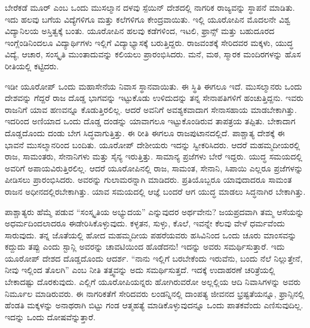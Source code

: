 \vskip 5pt

ಬೇರೆಕಡೆ ಮೂರ್​ ಎಂಬ ಒಂದು ಮುಸಲ್ಮಾನ ದಳವು ಸ್ಪೆಯಿನ್​ ದೇಶದಲ್ಲಿ ನಾಗರಿಕ ರಾಜ್ಯವನ್ನು ಸ್ಥಾಪನೆ ಮಾಡಿತು. ಇದು ಹಲವು ಬಗೆಯ ವಿದ್ಯೆಗಳಿಗೂ ಮತ್ತು ಕಲೆಗಳಿಗೂ ಕೇಂದ್ರವಾಯಿತು. ಇಲ್ಲಿ ಯೂರೋಪಿನ ಮೊದಲನೇ ವಿಶ್ವ ವಿದ್ಯಾನಿಲಯ ಅಸ್ತಿತ್ವಕ್ಕೆ ಬಂತು. ಯೂರೋಪಿನ ಹಲವು ಕಡೆಗಳಿಂದ, ಇಟಲಿ, ಫ್ರಾನ್ಸ್​ ಮತ್ತು ಬಹುದೂರದ ಇಂಗ್ಲೆಂಡಿನಿಂದಲೂ ವಿದ್ಯಾರ್ಥಿಗಳು ಇಲ್ಲಿಗೆ ವಿದ್ಯಾಭ್ಯಾಸಕ್ಕೆ ಬರುತ್ತಿದ್ದರು. ರಾಜವಂಶಕ್ಕೆ ಸೇರಿದವರ ಮಕ್ಕಳು, ಯುದ್ಧ ವಿದ್ಯೆ, ಆಚಾರ, ಸಂಸ್ಕೃತಿ ಮುಂತಾದುವನ್ನು ಕಲಿಯಲು ಪ್ರಾರಂಭಿಸಿದರು. ಮನೆ, ಮಠ, ಸ್ಮಾರಕ ಮಂದಿರಗಳನ್ನು ಹೊಸ ರೀತಿಯಲ್ಲಿ ಕಟ್ಟಿದರು.

\vskip 5pt

ಇಡೀ ಯೂರೋಪ್​ ಒಂದು ಮಹಾಸೇನೆಯ ನಿವಾಸ ಸ್ಥಾನವಾಯಿತು. ಈ ಸ್ಥಿತಿ ಈಗಲೂ ಇದೆ. ಮುಸಲ್ಮಾನರು ಒಂದು ದೇಶವನ್ನು ಗೆದ್ದರೆ ರಾಜ ದೊಡ್ಡ ಭಾಗವನ್ನು ಇಟ್ಟುಕೊಡು ಉಳಿದುದನ್ನು ತನ್ನ ಸೇನಾಪತಿಗಳಿಗೆ ಹಂಚುತ್ತಿದ್ದನು. ಇವರು ರಾಜನಿಗೆ ಯಾವ ಹಣವನ್ನೂ ಕೊಡುತ್ತಿರಲಿಲ್ಲ. ಆದರೆ ಅವನಿಗೆ ಅವಶ್ಯಕವಾದಾಗ ಸೇನಾಸಹಾಯ ಮಾಡಬೇಕಾಗಿತ್ತು. ಇದರಿಂದ ಅಣಿಯಾದ ಒಂದು ದೊಡ್ಡ ದಂಡನ್ನು ಯಾವಾಗಲೂ ಇಟ್ಟುಕೊಂಡಿರುವ ತಾಪತ್ರಯ ತಪ್ಪಿತು. ಬೇಕಾದಾಗ ದೊಡ್ಡದೊಂದು ದಂಡು ಬೇಗ ಸಿದ್ಧವಾಗುತ್ತಿತ್ತು. ಈ ರೀತಿ ಈಗಲೂ ರಾಜಪುಟಾನದಲ್ಲಿದೆ. ಪಾಶ್ಚಾತ್ಯ ದೇಶಕ್ಕೆ ಈ ಭಾವನೆ ಮುಸಲ್ಮಾನರಿಂದ ಬಂದಿತು. ಯೂರೋಪ್​ ದೇಶೀಯರು ಇದನ್ನು ಸ್ವೀಕರಿಸಿದರು. ಆದರೆ ಮಹಮ್ಮದೀಯರಲ್ಲಿ ರಾಜ, ಸಾಮಂತರು, ಸೇನಾನಿಗಳು ಮತ್ತು ಸೈನ್ಯ ಇರುತ್ತಿತ್ತು. ಸಾಮಾನ್ಯ ಪ್ರಜೆಗಳು ಬೇರೆ ಇದ್ದರು. ಯುದ್ಧ ಸಮಯದಲ್ಲಿ ಅವರಿಗೆ ಅಪಾಯವಿರುತ್ತಿರಲಿಲ್ಲ. ಆದರೆ ಯೂರೋಪಿನಲ್ಲಿ ರಾಜ, ಸಾಮಂತ, ಸೇನಾನಿ, ಸಿಪಾಯಿ ಎಲ್ಲರೂ ಪ್ರಜೆಗಳನ್ನು ಪೀಡಿಸಲು ಪ್ರಾರಂಭಿಸಿದರು. ಅವರನ್ನು ಗುಲಾಮರನ್ನಾಗಿ ಮಾಡಿದರು. ಪ್ರತಿಯೊಬ್ಬರೂ ಯಾವುದಾದರೂ ಸಾಮಂತ ರಾಜನ ಅಧೀನದಲ್ಲಿರಬೇಕಾಗಿತ್ತು. ಯಾವ ಸಮಯದಲ್ಲಿ ಆಜ್ಞೆ ಬಂದರೆ ಆಗ ಯುದ್ಧ ಮಾಡಲು ಸಿದ್ಧನಾಗಿರ ಬೇಕಾಗಿತ್ತು.

ಪಾಶ್ಚಾತ್ಯರು ಹೆಮ್ಮೆ ಪಡುವ “ಸಂಸ್ಕೃತಿಯ ಅಭ್ಯುದಯ” ಎನ್ನುವುದರ ಅರ್ಥವೇನು? ಜಯಪ್ರದವಾಗಿ ತಮ್ಮ ಆಸೆಯನ್ನು ಅಧರ್ಮದಿಂದಲಾದರೂ ಈಡೇರಿಸಿಕೊಳ್ಳುವುದು. ಕಳ್ಳತನ, ಸುಳ್ಳು, ಕೊಲೆ, ಇವನ್ನೇ ಕೆಲವು ವೇಳೆ ಧರ್ಮವೆಂದು ಸಾರುವುದು. ತನ್ನ ಜೊತೆಯಲ್ಲಿ ಹೋದ ಮಹಮ್ಮದೀಯ ಪಹರೆಯವರು ಹಸಿವಿನಿಂದ ಒಂದು ಚೂರು ಮಾಂಸವನ್ನು ಕದ್ದುದು ತಪ್ಪು ಎಂದು ಸ್ಟಾನ್ಲಿ ಅವರನ್ನು ಚಾವಟಿಯಿಂದ ಹೊಡೆದನು! ಇದನ್ನು ಅವರು ಸಮರ್ಥಿಸುತ್ತಾರೆ. ಇದು ಯೂರೋಪ್​ ದೇಶದ ದೊಡ್ಡದೊಂದು ಆದರ್ಶ. “ನಾನು ಇಲ್ಲಿಗೆ ಬರಬೇಕೆಂದು ಇರುವೆನು, ಬಂದು ನೆಲೆ ನಿಲ್ಲುತ್ತೇನೆ, ನೀವು ಇಲ್ಲಿಂದ ತೊಲಗಿ” ಎಂಬ ನೀತಿ ತತ್ತ್ವವನ್ನು ಅದು ಸಮರ್ಥಿಸುತ್ತದೆ. ಇದಕ್ಕೆ ಉದಾಹರಣೆ ಚರಿತ್ರೆಯಲ್ಲಿ ಬೇಕಾದಷ್ಟು ದೊರಕುವುದು. ಎಲ್ಲಿಗೆ ಯೂರೋಪಿಯನ್ನರು ಹೋಗಿರುವರೋ ಅಲ್ಲಲ್ಲಿಯ ಆದಿ ನಿವಾಸಿಗಳನ್ನು ಅವರು ನಿರ್ಮೂಲ ಮಾಡಿರುವರು. ಈ ನಾಗರಿಕತೆಗೆ ಸೇರಿದವರು ಲಂಡನ್ನಿನಲ್ಲಿ ದಾಂಪತ್ಯ ಜೀವನದ ಭ್ರಷ್ಟತೆಯನ್ನೂ, ಫ್ರಾನ್ಸಿನಲ್ಲಿ ಹೆಂಡತಿ ಮಕ್ಕಳನ್ನು ಅನಾಥರಾಗಿ ಬಿಟ್ಟು ಗಂಡ ಆತ್ಮಹತ್ಯೆ ಮಾಡಿಕೊಳ್ಳುವುದನ್ನೂ ಒಂದು ಪಾತಕವೆಂದು ಎಣಿಸುವುದಿಲ್ಲ. ಇದನ್ನು ಒಂದು ದೋಷವೆನ್ನುತ್ತಾರೆ.

